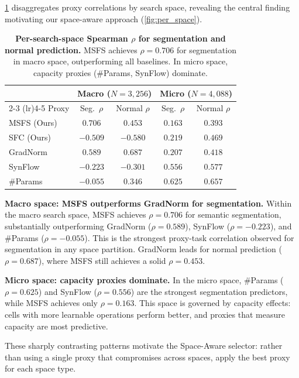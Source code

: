 \documentclass[10pt,twocolumn,letterpaper]{article}
\newcommand{\sfc}{\textsc{SFC}}
\newcommand{\msfs}{\textsc{MSFS}}
\begin{document}
\cref{tab:per_space} disaggregates proxy correlations by search space, revealing the central finding motivating our space-aware approach (\cref{fig:per_space}).

\begin{table}[t]
\centering
\caption{\textbf{Per-search-space Spearman $\rho$ for segmentation and normal prediction.} \msfs{} achieves $\rho{=}0.706$ for segmentation in macro space, outperforming all baselines. In micro space, capacity proxies (\#Params, SynFlow) dominate.}
\label{tab:per_space}
\small
\setlength{\tabcolsep}{3pt}
\begin{tabular}{@{}lcccc@{}}
\toprule
& \multicolumn{2}{c}{Macro ($N{=}3{,}256$)} & \multicolumn{2}{c}{Micro ($N{=}4{,}088$)} \\
\cmidrule(lr){2-3} \cmidrule(lr){4-5}
Proxy & Seg.\ $\rho$ & Normal $\rho$ & Seg.\ $\rho$ & Normal $\rho$ \\
\midrule
\msfs{} (Ours) & $\mathbf{0.706}$ & $0.453$ & $0.163$ & $0.393$ \\
\sfc{} (Ours)  & $-0.509$ & $-0.580$ & $0.219$ & $0.469$ \\
GradNorm       & $0.589$ & $\mathbf{0.687}$ & $0.207$ & $0.418$ \\
SynFlow        & $-0.223$ & $-0.301$ & $0.556$ & $0.577$ \\
\#Params       & $-0.055$ & $0.346$ & $\mathbf{0.625}$ & $\mathbf{0.657}$ \\
\bottomrule
\end{tabular}
\end{table}

\textbf{Macro space: MSFS outperforms GradNorm for segmentation.}
Within the macro search space, \msfs{} achieves $\rho{=}0.706$ for semantic segmentation, substantially outperforming GradNorm ($\rho{=}0.589$), SynFlow ($\rho{=}{-}0.223$), and \#Params ($\rho{=}{-}0.055$).
This is the strongest proxy-task correlation observed for segmentation in any space partition.
GradNorm leads for normal prediction ($\rho{=}0.687$), where MSFS still achieves a solid $\rho{=}0.453$.

\textbf{Micro space: capacity proxies dominate.}
In the micro space, \#Params ($\rho{=}0.625$) and SynFlow ($\rho{=}0.556$) are the strongest segmentation predictors, while \msfs{} achieves only $\rho{=}0.163$.
This space is governed by capacity effects: cells with more learnable operations perform better, and proxies that measure capacity are most predictive.

These sharply contrasting patterns motivate the Space-Aware selector: rather than using a single proxy that compromises across spaces, apply the best proxy for each space type.
\end{document}
